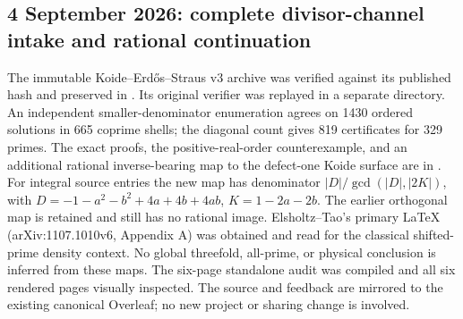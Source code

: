 \subsection*{4 September 2026: complete divisor-channel intake and rational continuation}
The immutable Koide--Erd\H{o}s--Straus v3 archive was verified against its
published hash and preserved in
.
Its original verifier was replayed in a separate directory. An independent
smaller-denominator enumeration agrees on 1430 ordered solutions in 665
coprime shells; the diagonal count gives 819 certificates for 329 primes.
The exact proofs, the positive-real-order counterexample, and an additional
rational inverse-bearing map to the defect-one Koide surface are in
.
For integral source entries the new map has denominator
$|D|/\gcd(|D|,|2K|)$, with
$D=-1-a^2-b^2+4a+4b+4ab$, $K=1-2a-2b$.
The earlier orthogonal map is retained and still has no rational image.
Elsholtz--Tao's primary LaTeX (arXiv:1107.1010v6, Appendix A) was obtained
and read for the classical shifted-prime density context. No global
threefold, all-prime, or physical conclusion is inferred from these maps.
The six-page standalone audit was compiled and all six rendered pages
visually inspected. The source and feedback are mirrored to the existing
canonical Overleaf; no new project or sharing change is involved.

